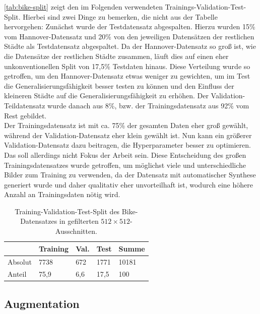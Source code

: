 \autoref{tab:bike-split} zeigt den im Folgenden verwendeten Trainings-Validation-Test-Split. 
Hierbei sind zwei Dinge zu bemerken, die nicht aus der Tabelle hervorgehen: 
Zunächst wurde der Testdatensatz abgespalten. Hierzu wurden 15\% vom Hannover-Datensatz und 
20\% von den jeweiligen Datensätzen der restlichen Städte als Testdatensatz abgespaltet. Da der Hannover-Datensatz so groß ist, wie die Datensätze der
restlichen Städte zusammen, läuft dies auf einen eher unkonventionellen Split von 17,5\% Testdaten hinaus. Diese Verteilung wurde so getroffen, 
um den Hannover-Datensatz etwas weniger zu gewichten, um im Test die Generalisierungsfähigkeit besser testen zu können
und den Einfluss der kleineren Städte auf die Generalisierungsfähigkeit zu erhöhen. Der Validation-Teildatensatz wurde danach aus 8\%, 
bzw. der Trainingsdatensatz aus 92\% vom Rest gebildet. \\
Der Trainingsdatensatz ist mit ca. 75\% der gesamten Daten eher groß gewählt, während der Validation-Datensatz eher klein gewählt ist. 
Nun kann ein größerer Validation-Datensatz dazu beitragen, die Hyperparameter besser zu optimieren. Das soll allerdings nicht Fokus der Arbeit sein.
Diese Entscheidung des großen Trainingsdatensatzes wurde getroffen,
um möglichst viele und unterschiedliche Bilder zum Training zu verwenden, da der Datensatz mit automatischer Synthese 
generiert wurde und daher qualitativ eher unvorteilhaft ist, wodurch eine höhere Anzahl an Trainingsdaten nötig wird.

\begin{table}
	\centering
	\begin{tabular}{l|l|l|l|l}
		& Training & Val. & Test & Summe \\
		\midrule
		Absolut & 7738 & 672 & 1771 & 10181 \\
		Anteil & 75,9 & 6,6 & 17,5 & 100 \\ 
	\end{tabular}
	\caption{Training-Validation-Test-Split des Bike-Datensatzes in gefilterten $512 \times 512$-Ausschnitten.}
	\label{tab:bike-split}
\end{table}


\subsection{Augmentation}

